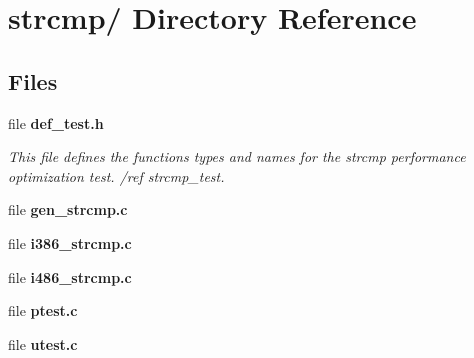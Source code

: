 \section{strcmp/ Directory Reference}
\label{dir_000008}
\subsection*{Files}
\begin{CompactItemize}
\item 
file {\bf def\_\-test.h}
\begin{CompactList}\small\item\em This file defines the functions types and names for the strcmp performance optimization test. /ref strcmp\_\-test. \item\end{CompactList}

\item 
file {\bf gen_strcmp.c}
\item 
file {\bf i386_strcmp.c}
\item 
file {\bf i486_strcmp.c}
\item 
file {\bf ptest.c}
\item 
file {\bf utest.c}
\end{CompactItemize}
